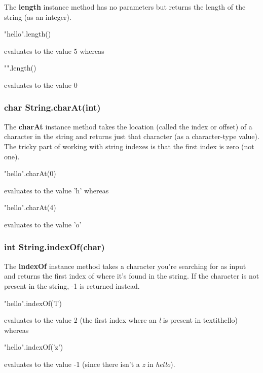 The \textbf{length} instance method has no parameters but returns the length of the string (as an integer). 

\begin{exa}

\begin{code} 
"hello".length() 
\end{code}

evaluates to the value 5 whereas

\begin{code} 
"".length() 
\end{code}

evaluates to the value 0

\end{exa}

\subsubsection{char String.charAt(int)}

The \textbf{charAt} instance method takes the location (called the index or offset) of a character in the string and returns just that character (as a character-type value). The tricky part of working with string indexes is that the first index is zero (not one). 

\begin{exa}

\begin{code} 
"hello".charAt(0) 
\end{code}

evaluates to the value 'h' whereas

\begin{code} 
"hello".charAt(4) 
\end{code}

evaluates to the value 'o'

\end{exa}

\subsubsection{int String.indexOf(char)}

The \textbf{indexOf} instance method takes a character you're searching for as input and returns the first index of where it's found in the string. If the character is not present in the string, -1 is returned instead. 


\begin{exa}

\begin{code} 
"hello".indexOf('l') 
\end{code}

evaluates to the value 2 (the first index where an \textit{l} is present in textit{hello}) whereas

\begin{code} 
"hello".indexOf('z') 
\end{code}

evaluates to the value -1 (since there isn't a \textit{z} in \textit{hello}). 

\end{exa}

